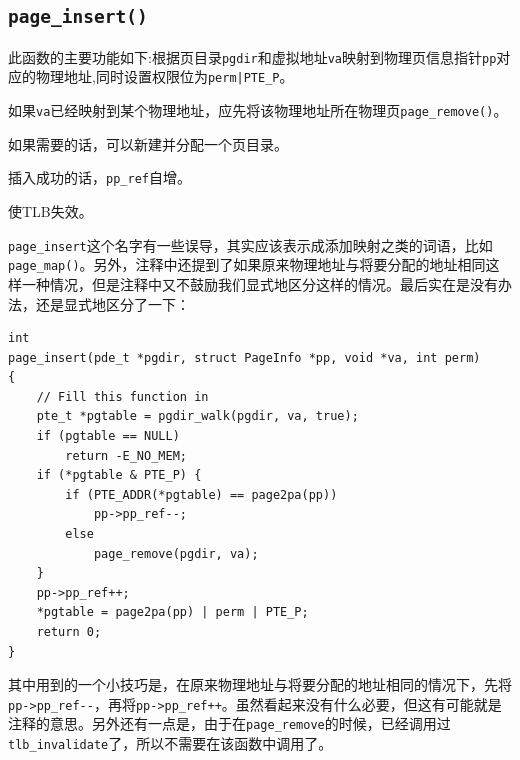 \documentclass[11pt]{article}
\newenvironment{packed_enum}{
\begin{enumerate}
  \setlength{\itemsep}{1pt}
  \setlength{\parskip}{0pt}
  \setlength{\parsep}{0pt}
}{\end{enumerate}}
\begin{document}
\subsection{\lstinline|page_insert()|}
此函数的主要功能如下:根据页目录\lstinline|pgdir|和虚拟地址\lstinline|va|映射到物理页信息指针\lstinline|pp|对应的物理地址,同时设置权限位为\lstinline!perm|PTE_P!。
\begin{packed_enum}
\item 如果\lstinline|va|已经映射到某个物理地址，应先将该物理地址所在物理页\lstinline|page_remove()|。
\item 如果需要的话，可以新建并分配一个页目录。
\item 插入成功的话，\lstinline|pp_ref|自增。
\item 使TLB失效。
\end{packed_enum}
\lstinline|page_insert|这个名字有一些误导，其实应该表示成添加映射之类的词语，比如\lstinline|page_map()|。另外，注释中还提到了如果原来物理地址与将要分配的地址相同这样一种情况，但是注释中又不鼓励我们显式地区分这样的情况。最后实在是没有办法，还是显式地区分了一下：
\begin{lstlisting}[title=kern/pmap.c]
int
page_insert(pde_t *pgdir, struct PageInfo *pp, void *va, int perm)
{
	// Fill this function in
	pte_t *pgtable = pgdir_walk(pgdir, va, true);
	if (pgtable == NULL)
		return -E_NO_MEM;
	if (*pgtable & PTE_P) {
		if (PTE_ADDR(*pgtable) == page2pa(pp))
			pp->pp_ref--;
		else
			page_remove(pgdir, va);
	}
	pp->pp_ref++;
	*pgtable = page2pa(pp) | perm | PTE_P;
	return 0;
}
\end{lstlisting}
其中用到的一个小技巧是，在原来物理地址与将要分配的地址相同的情况下，先将\lstinline|pp->pp_ref--|，再将\lstinline|pp->pp_ref++|。虽然看起来没有什么必要，但这有可能就是注释的意思。另外还有一点是，由于在\lstinline|page_remove|的时候，已经调用过\lstinline|tlb_invalidate|了，所以不需要在该函数中调用了。
\end{document}
